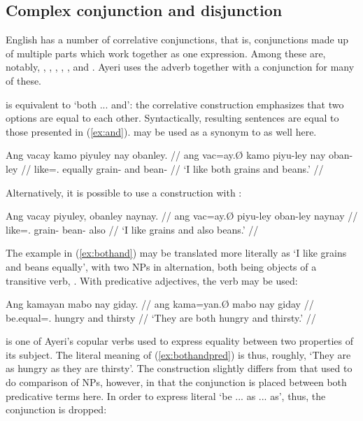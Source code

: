 
\subsection{Complex conjunction and disjunction}
\label{subsec:corrconj}

English has a number of correlative conjunctions, that is, conjunctions made up
of multiple parts which work together as one expression. Among these are,
notably,
,
,
,
,
, and
.
Ayeri uses the adverb  together with a 
conjunction for many of these.


 is equivalent to 
`both ... and': the correlative construction emphasizes that two options are 
equal to each other. Syntactically, resulting sentences are equal to those
presented in (\ref{ex:and}).  may be used as a synonym 
to  as well here.

\ex\label{ex:bothand}
\begingl
	\gla Ang vacay kamo piyuley nay obanley. //
	\glb ang vac=ay.Ø kamo piyu-ley nay oban-ley //
	\glc \AgtT{} like=\Fsg{}.\Top{} equally grain-\PargI{} and
		bean-\PargI{} //
	\glft `I like both grains and beans.' //
\endgl
\xe

Alternatively, it is possible to use a construction with 
:

\ex
\begingl
	\gla Ang vacay piyuley, obanley naynay. //
	\glb ang vac=ay.Ø piyu-ley oban-ley naynay //
	\glc \AgtT{} like=\Fsg{}.\Top{} grain-\PargI{} bean-\PargI{} also //
	\glft `I like grains and also beans.' //
\endgl
\xe

The example in (\ref{ex:bothand}) may be translated more literally as `I like 
grains and beans equally', with two NPs in alternation, both being objects of a 
transitive verb, . With predicative adjectives, the 
verb  may be used:

\ex\label{ex:bothandpred}
\begingl
	\gla Ang kamayan mabo nay giday. //
	\glb ang kama=yan.Ø mabo nay giday //
	\glc \AgtT{} be.equal=\TplM{}.\Top{} hungry and thirsty //
	\glft `They are both hungry and thirsty.' //
\endgl
\xe

 is one of Ayeri's copular verbs used to express equality 
between two properties of its subject. The literal meaning of 
(\ref{ex:bothandpred}) is thus, roughly, `They are as hungry as they are 
thirsty'. The construction slightly differs from that used to do comparison of 
NPs, however, in that the conjunction  is placed between both 
predicative terms here. In order to express literal `be ... as ... as', thus, 
the conjunction is dropped:

